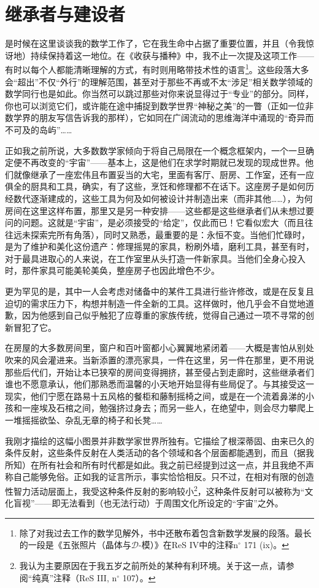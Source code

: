 
\section{继承者与建设者}

是时候在这里谈谈我的数学工作了，它在我生命中占据了重要位置，并且（令我惊讶地）持续保持着这一地位。在《收获与播种》中，我不止一次提及这项工作——有时以每个人都能清晰理解的方式，有时则用略带技术性的语言\footnote{除了对我过去工作的数学见解外，书中还散布着包含新数学发展的段落。最长的一段是《五张照片（晶体与$\mathscr{D}$-模）》在ReS IV中的注释n$^{\circ}$ 171 (ix)。}。这些段落大多会“超出”不仅“外行”的理解范围，甚至对于那些不再或不太“涉足”相关数学领域的数学同行也是如此。你当然可以跳过那些对你来说显得过于“专业”的部分。同样，你也可以浏览它们，或许能在途中捕捉到数学世界“神秘之美”的一瞥（正如一位非数学界的朋友写信告诉我的那样），它如同在广阔流动的思维海洋中涌现的“奇异而不可及的岛屿”……

正如我之前所说，大多数数学家倾向于将自己局限在一个概念框架内，一个一旦确定便不再改变的“宇宙”——基本上，这是他们在求学时期就已发现的现成世界。他们就像继承了一座宏伟且布置妥当的大宅，里面有客厅、厨房、工作室，还有一应俱全的厨具和工具，确实，有了这些，烹饪和修理都不在话下。这座房子是如何历经数代逐渐建成的，这些工具为何及如何被设计并制造出来（而非其他……），为何房间在这里这样布置，那里又是另一种安排——这些都是这些继承者们从未想过要问的问题。这就是“宇宙”，是必须接受的“给定”，仅此而已！它看似宏大（而且往往远未探索完所有角落），同时又熟悉，最重要的是：永恒不变。当他们忙碌时，是为了维护和美化这份遗产：修理摇晃的家具，粉刷外墙，磨利工具，甚至有时，对于最具进取心的人来说，在工作室里从头打造一件新家具。当他们全身心投入时，那件家具可能美轮美奂，整座房子也因此增色不少。

更为罕见的是，其中一人会考虑对储备中的某件工具进行些许修改，或是在反复且迫切的需求压力下，构想并制造一件全新的工具。这样做时，他几乎会不自觉地道歉，因为他感到自己似乎触犯了应尊重的家族传统，觉得自己通过一项不寻常的创新冒犯了它。

在房屋的大多数房间里，窗户和百叶窗都小心翼翼地紧闭着——大概是害怕从别处吹来的风会灌进来。当新添置的漂亮家具，一件在这里，另一件在那里，更不用说那些后代们，开始让本已狭窄的房间变得拥挤，甚至侵占到走廊时，这些继承者们谁也不愿意承认，他们那熟悉而温馨的小天地开始显得有些局促了。与其接受这一现实，他们宁愿在路易十五风格的餐柜和藤制摇椅之间，或是在一个流着鼻涕的小孩和一座埃及石棺之间，勉强挤过身去；而另一些人，在绝望中，则会尽力攀爬上一堆摇摇欲坠、杂乱无章的椅子和长凳……

我刚才描绘的这幅小图景并非数学家世界所独有。它描绘了根深蒂固、由来已久的条件反射，这些条件反射在人类活动的各个领域和各个层面都能遇到，而且（据我所知）在所有社会和所有时代都是如此。我之前已经提到过这一点，并且我绝不声称自己能够免俗。正如我的证言所示，事实恰恰相反。只不过，在相对有限的创造性智力活动层面上，我受这种条件反射的影响较小\footnote{我认为主要原因在于我五岁之前所处的某种有利环境。关于这一点，请参阅“纯真”注释（ReS III, n$^{\circ}$ 107）。}，这种条件反射可以被称为“文化盲视”——即无法看到（也无法行动）于周围文化所设定的“宇宙”之外。

